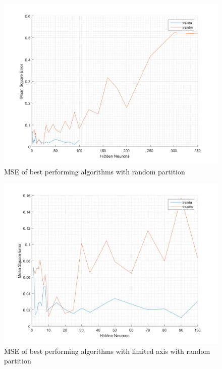 \documentclass[a4paper, 10pt, conference]{ieeeconf}
\begin{document}
\begin{figure}[!ht]
    \centering
    \includegraphics[width=\linewidth]{pic/mixed_best_fullrange.png}
    \caption{MSE of best performing algorithms with random partition}
    \label{fig:mixed_full}
\end{figure}

\begin{figure}[!ht]
    \centering
    \includegraphics[width=\linewidth]{pic/mixed_best_limited.png}
    \caption{MSE of best performing algorithms with limited axis with random partition}
    \label{fig:mixed_limited}
\end{figure}
\end{document}
